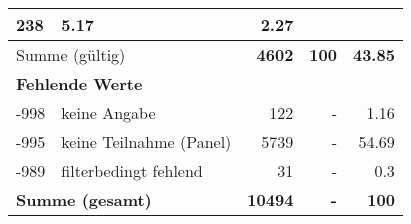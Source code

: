 \begin{longtable}{lXrrr}
       \num{238} &
       \num[round-mode=places,round-precision=2]{5,17} &
         \num[round-mode=places,round-precision=2]{2,27} \\
     \midrule
     \multicolumn{2}{l}{Summe (gültig)} &
       \textbf{\num{4602}} &
     \textbf{100} &
       \textbf{\num[round-mode=places,round-precision=2]{43,85}} \\
     \multicolumn{5}{l}{\textbf{Fehlende Werte}}\\
       -998 &
       keine Angabe &
         \num{122} &
        - &
         \num[round-mode=places,round-precision=2]{1,16} \\
       -995 &
       keine Teilnahme (Panel) &
         \num{5739} &
        - &
         \num[round-mode=places,round-precision=2]{54,69} \\
       -989 &
       filterbedingt fehlend &
         \num{31} &
        - &
         \num[round-mode=places,round-precision=2]{0,3} \\
     \midrule
     \multicolumn{2}{l}{\textbf{Summe (gesamt)}} &
          \textbf{\num{10494}} &
        \textbf{-} &
        \textbf{100} \\
     \bottomrule
     \end{longtable}
     

